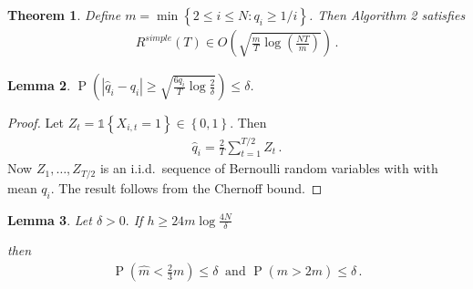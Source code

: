 \documentclass{article}
\newcommand{\set}[1]{\left\{#1\right\}}
\newcommand{\ind}[1]{\mathds{1}\!\!\set{#1}}
\newcommand{\eq}[1]{\begin{align*}#1\end{align*}}
\renewcommand{\P}[1]{\operatorname{P}\left(#1\right)}
\theoremstyle{plain}
\newtheorem{theorem}{Theorem}
\newtheorem{lemma}[theorem]{Lemma}
\theoremstyle{definition}
\begin{document}
\begin{theorem}\label{thm:simple-regret}
Define $m = \min\set{2 \leq i \leq N : q_i \geq 1/i}$.
Then Algorithm 2 satisfies
\eq{
R^{simple}(T) \in O\left(\sqrt{\frac{m}{T} \log \left(\frac{NT}{m}\right)}\right)\,.
}
\end{theorem}

\begin{lemma}\label{lem:conc1}
$\displaystyle \P{\left|\hat q_i - q_i\right| \geq \sqrt{\frac{6q_i}{T} \log \frac{2}{\delta}}} \leq \delta$.
\end{lemma}

\begin{proof}
Let $Z_t = \ind{X_{i,t} = 1} \in \set{0,1}$.
Then
\eq{
\hat q_i = \frac{2}{T} \sum_{t=1}^{T/2} Z_t\,.
}
Now $Z_1,\ldots,Z_{T/2}$ is an i.i.d.\ sequence of Bernoulli random variables with with mean $q_i$. The result follows from the Chernoff bound.
\end{proof}
\begin{lemma}\label{lem:m_est}
Let $\delta >0.$ 
If $h \geq 24m \log\frac{4N}{\delta}$

then
\eq{
\P{\hat m < \frac{2}{3}m} \leq \delta\ \text{ and } \P{\hat m > 2m} \leq \delta\,.
}
\end{lemma}
\end{document}
